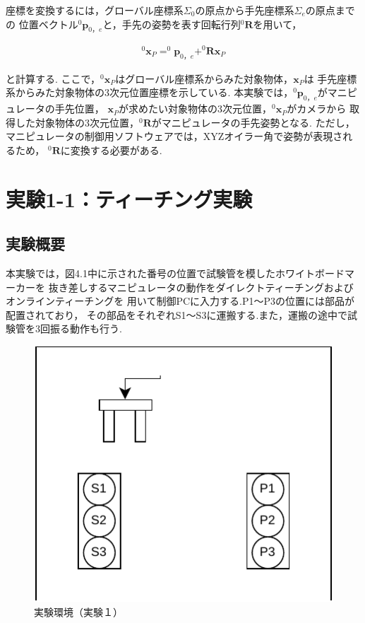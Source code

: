座標を変換するには，グローバル座標系$\Sigma_0$の原点から手先座標系$\Sigma_e$の原点までの
位置ベクトル$^0\mathbf{p}_{0，e}$と，手先の姿勢を表す回転行列$^0\mathbf{R}$を用いて，

\begin{align}
  ^0\mathbf{x}_{P} = ^0\mathbf{p}_{0，e} + ^0\mathbf{R} \mathbf{x}_{P} \tag{3.1}
\end{align}

と計算する.
ここで，$^0\mathbf{x}_{P}$はグローバル座標系からみた対象物体，$\mathbf{x}_{P}$は
手先座標系からみた対象物体の3次元位置座標を示している.
本実験では，$^0\mathbf{p}_{0，e}$がマニピュレータの手先位置，
$\mathbf{x}_{P}$が求めたい対象物体の3次元位置，$^0\mathbf{x}_{P}$がカメラから
取得した対象物体の3次元位置，$^0\mathbf{R}$がマニピュレータの手先姿勢となる.
ただし，マニピュレータの制御用ソフトウェアでは，XYZオイラー角で姿勢が表現されるため，
$^0\mathbf{R}$に変換する必要がある.


\section{実験1-1：ティーチング実験}

\subsection{実験概要}
本実験では，図4.1中に示された番号の位置で試験管を模したホワイトボードマーカーを
抜き差しするマニピュレータの動作をダイレクトティーチングおよびオンラインティーチングを
用いて制御PCに入力する.P1～P3の位置には部品が配置されており，
その部品をそれぞれS1～S3に運搬する.また，運搬の途中で試験管を3回振る動作も行う.

\begin{figure}[h]
  \centering
  \includegraphics[scale=0.6]{sozai/2.pdf}
  \caption{実験環境（実験１）}
\end{figure}


